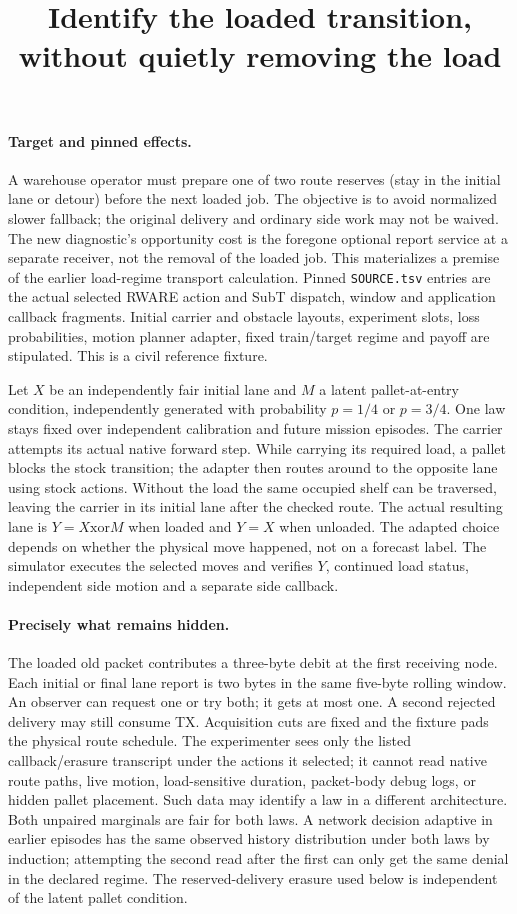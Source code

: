 \documentclass{article}
\title{Identify the loaded transition, without quietly removing the load}
\date{}
\begin{document}
\maketitle

\paragraph{Target and pinned effects.}
A warehouse operator must prepare one of two route reserves
(stay in the initial lane or detour) before the next loaded job.
The objective is to avoid normalized slower fallback; the original
delivery and ordinary side work may not be waived. The new
diagnostic's opportunity cost is the foregone optional report
service at a separate receiver, not the removal of the loaded job.
This materializes a premise of the earlier load-regime transport
calculation. Pinned \verb|SOURCE.tsv| entries are the actual selected
RWARE action and SubT dispatch, window and application callback
fragments. Initial carrier and obstacle layouts, experiment slots,
loss probabilities, motion planner adapter, fixed train/target
regime and payoff are stipulated. This is a civil reference fixture.

Let $X$ be an independently fair initial lane and $M$ a latent
pallet-at-entry condition, independently generated with probability
$p=1/4$ or $p=3/4$. One law stays fixed over independent calibration
and future mission episodes. The carrier attempts its actual
native forward step. While carrying its required load, a pallet
blocks the stock transition; the adapter then routes around to the
opposite lane using stock actions. Without the load the same
occupied shelf can be traversed, leaving the carrier in its
initial lane after the checked route. The actual resulting lane is
$Y=X\mathbin{\mathrm{xor}} M$ when loaded and $Y=X$ when unloaded.
The adapted choice depends on whether the physical move happened,
not on a forecast label. The simulator executes the selected
moves and verifies $Y$, continued load status, independent side
motion and a separate side callback.

\paragraph{Precisely what remains hidden.}
The loaded old packet contributes a three-byte debit at the
first receiving node. Each initial or final lane report is two
bytes in the same five-byte rolling window. An observer can
request one or try both; it gets at most one. A second rejected
delivery may still consume TX. Acquisition cuts are fixed
and the fixture pads the physical route schedule. The experimenter
sees only the listed callback/erasure transcript under the actions
it selected; it cannot read native route paths, live motion,
load-sensitive duration, packet-body debug logs, or hidden
pallet placement. Such data may identify a law in a different
architecture. Both unpaired marginals are fair for both laws.
A network decision adaptive in earlier episodes has the same
observed history distribution under both laws by induction;
attempting the second read after the first can only get the
same denial in the declared regime. The reserved-delivery
erasure used below is independent of the latent pallet condition.
\end{document}
